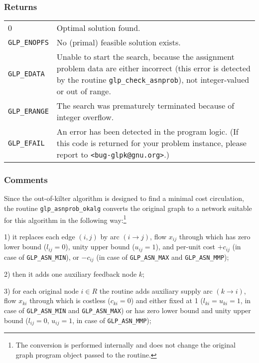 \subsubsection*{Returns}

\def\arraystretch{1}

\begin{tabular}{@{}p{25mm}p{97.3mm}@{}}
0 & Optimal solution found.\\
\verb|GLP_ENOPFS| & No (primal) feasible solution exists.\\
\verb|GLP_EDATA| & Unable to start the search, because the assignment
problem data are either incorrect (this error is detected by the
routine \verb|glp_check_asnprob|), not integer-valued or out of range.\\
\verb|GLP_ERANGE| & The search was prematurely terminated because of
integer overflow.\\
\verb|GLP_EFAIL| & An error has been detected in the program logic.
(If this code is returned for your problem instance, please report to
\verb|<bug-glpk@gnu.org>|.)\\
\end{tabular}

\subsubsection*{Comments}

Since the out-of-kilter algorithm is designed to find a minimal cost
circulation, the routine \verb|glp_asnprob_okalg| converts the original
graph to a network suitable for this algorithm in the following
way:\footnote{The conversion is performed internally and does not change
the original graph program object passed to the routine.}

1) it replaces each edge $(i,j)$ by arc $(i\rightarrow j)$,
flow $x_{ij}$ through which has zero lower bound ($l_{ij}=0$), unity
upper bound ($u_{ij}=1$), and per-unit cost $+c_{ij}$ (in case of
\verb|GLP_ASN_MIN|), or $-c_{ij}$ (in case of \verb|GLP_ASN_MAX| and
\verb|GLP_ASN_MMP|);

2) then it adds one auxiliary feedback node $k$;

\newpage

3) for each original node $i\in R$ the routine adds auxiliary supply
arc $(k\rightarrow i)$, flow $x_{ki}$ through which is costless
($c_{ki}=0$) and either fixed at 1 ($l_{ki}=u_{ki}=1$, in case of
\verb|GLP_ASN_MIN| and \verb|GLP_ASN_MAX|) or has zero lower bound and
unity upper bound ($l_{ij}=0$, $u_{ij}=1$, in case of
\verb|GLP_ASN_MMP|);

